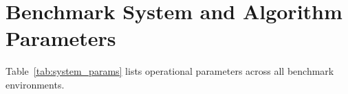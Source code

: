 \documentclass[journal]{IEEEtran}
\begin{document}


\section{Benchmark System and Algorithm Parameters}
Table~\ref{tab:system_params} lists operational parameters across all benchmark environments.





\end{document}
